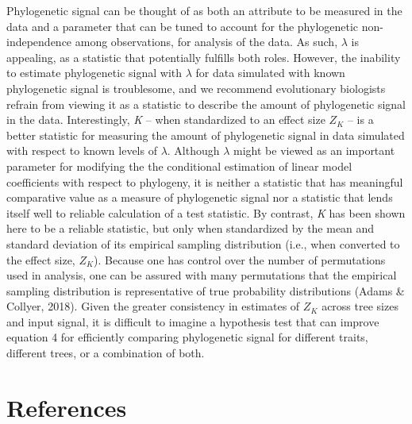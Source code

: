 \documentclass[
]{article}
\begin{document}
Phylogenetic signal can be thought of as both an attribute to be
measured in the data and a parameter that can be tuned to account for
the phylogenetic non-independence among observations, for analysis of
the data. As such, \(\lambda\) is appealing, as a statistic that
potentially fulfills both roles. However, the inability to estimate
phylogenetic signal with \(\lambda\) for data simulated with known
phylogenetic signal is troublesome, and we recommend evolutionary
biologists refrain from viewing it as a statistic to describe the amount
of phylogenetic signal in the data. Interestingly, \emph{K} -- when
standardized to an effect size \(Z_K\) -- is a better statistic for
measuring the amount of phylogenetic signal in data simulated with
respect to known levels of \(\lambda\). Although \(\lambda\) might be
viewed as an important parameter for modifying the the conditional
estimation of linear model coefficients with respect to phylogeny, it is
neither a statistic that has meaningful comparative value as a measure
of phylogenetic signal nor a statistic that lends itself well to
reliable calculation of a test statistic. By contrast, \emph{K} has been
shown here to be a reliable statistic, but only when standardized by the
mean and standard deviation of its empirical sampling distribution
(i.e., when converted to the effect size, \(Z_K\)). Because one has
control over the number of permutations used in analysis, one can be
assured with many permutations that the empirical sampling distribution
is representative of true probability distributions (Adams \& Collyer,
2018). Given the greater consistency in estimates of \(Z_K\) across tree
sizes and input signal, it is difficult to imagine a hypothesis test
that can improve equation 4 for efficiently comparing phylogenetic
signal for different traits, different trees, or a combination of both.

\newpage

\hypertarget{references}{%
\section*{References}\label{references}}

\setlength{\parindent}{-0.25in} \setlength{\leftskip}{0.25in}
\setlength{\parskip}{8pt} \noindent
\end{document}
